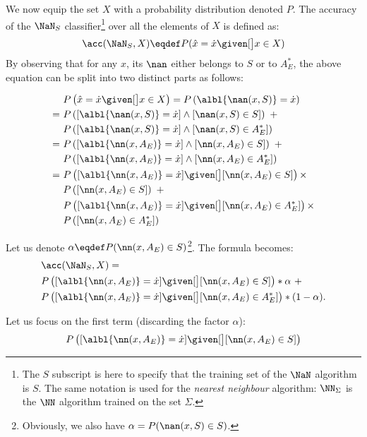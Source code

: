 \documentclass{ecai}
\begin{document}
We now equip the set $X$ with a probability distribution denoted $P$.  The
accuracy of the $\NaN_S$ classifier\footnote{The $S$ subscript is here to
  specify that the training set of the $\NaN$ algorithm is $S$. The same
  notation is used for the \textit{nearest neighbour} algorithm: $\NN_\Sigma$ is the
  $\NN$ algorithm trained on the set $\Sigma$.} over all the elements of $X$ is
  defined as: $$\acc(\NaN_S, X)\eqdef P(\hat{x}=\dot{x} \given[\big] x \in X)$$ By
  observing that for any $x$, its $\nan$ either belongs to $S$ or to $A_E^*$,
  the above equation can be split into two distinct parts as follows:

  \begin{align*}
  &P\left(\hat{x}=\dot{x} \given[\big] x \in X\right) = P\left(\albl{\nan(x,
  S)} = \dot{x}\right)\\
=~&P\left([\albl{\nan(x, S)} = \dot{x} ]\wedge [\nan(x, S) \in S
] \right)~ + \\
&P\left([\albl{\nan(x, S)} = \dot{x}] \wedge [\nan(x, S) \in A_E^*]\right)\\ %
=~&P\left([\albl{\nn(x, A_E)} = \dot{x}] \wedge [\nn(x, A_E) \in S ]\right)~ + \\
  &P\left([\albl{\nn(x, A_E)} = \dot{x}] \wedge [\nn(x, A_E) \in A_E^*]\right)
\\
=~&P\left([\albl{\nn(x, A_E)} = \dot{x}] \given[\big] [\nn(x, A_E) \in S
]\right) \times \\ &P\left([\nn(x, A_E) \in S]\right) ~+ \\
&P\left([\albl{\nn(x, A_E)} = \dot{x}] \given[\big] [\nn(x, A_E) \in
A_E^*]\right) \times \\ &P\left([ \nn(x, A_E) \in A_E^*]\right)
\end{align*}

Let us denote  $\alpha \eqdef P(\nn(x, A_E) \in S)$\footnote{Obviously, we
also have $\alpha = P(\nan(x, S) \in S)$.}.
The formula becomes:
\begin{align*}
  &\acc(\NaN_S, X) = \\&P\left([\albl{\nn(x, A_E)} = \dot{x}] \given[\big] [\nn(x, A_E)
\in S] \right) * \alpha ~+ \\
&P\left([\albl{\nn(x, A_E)} = \dot{x}] \given[\big] [\nn(x, A_E) \in
A_E^*]\right) * (1 -
\alpha).
\end{align*}

Let us focus on the first term  (discarding the factor $\alpha$):
$$P\left([\albl{\nn(x, A_E)} = \dot{x}] \given[\big] [\nn(x, A_E) \in S] \right)$$
\end{document}
